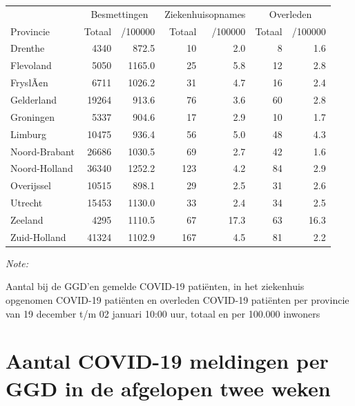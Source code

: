 \documentclass[
  english,
  man,floatsintext]{apa6}
\begin{document}
\begin{table}
\centering
\begin{threeparttable}
\begin{tabular}{lrrrrrr}
\toprule
\multicolumn{1}{c}{ } & \multicolumn{2}{c}{Besmettingen} & \multicolumn{2}{c}{Ziekenhuisopnames} & \multicolumn{2}{c}{Overleden} \\
\cmidrule(l{3pt}r{3pt}){2-3} \cmidrule(l{3pt}r{3pt}){4-5} \cmidrule(l{3pt}r{3pt}){6-7}
Provincie & Totaal & /100000 & Totaal & /100000 & Totaal & /100000\\
\midrule
Drenthe & 4340 & 872.5 & 10 & 2.0 & 8 & 1.6\\
Flevoland & 5050 & 1165.0 & 25 & 5.8 & 12 & 2.8\\
FryslÃ¢n & 6711 & 1026.2 & 31 & 4.7 & 16 & 2.4\\
Gelderland & 19264 & 913.6 & 76 & 3.6 & 60 & 2.8\\
Groningen & 5337 & 904.6 & 17 & 2.9 & 10 & 1.7\\
Limburg & 10475 & 936.4 & 56 & 5.0 & 48 & 4.3\\
Noord-Brabant & 26686 & 1030.5 & 69 & 2.7 & 42 & 1.6\\
Noord-Holland & 36340 & 1252.2 & 123 & 4.2 & 84 & 2.9\\
Overijssel & 10515 & 898.1 & 29 & 2.5 & 31 & 2.6\\
Utrecht & 15453 & 1130.0 & 33 & 2.4 & 34 & 2.5\\
Zeeland & 4295 & 1110.5 & 67 & 17.3 & 63 & 16.3\\
Zuid-Holland & 41324 & 1102.9 & 167 & 4.5 & 81 & 2.2\\
\bottomrule
\end{tabular}
\begin{tablenotes}
\item \textit{Note: } 
\item Aantal bij de GGD’en gemelde COVID-19 patiënten, in het ziekenhuis opgenomen COVID-19 patiënten en overleden COVID-19 patiënten per provincie van 19 december t/m 02 januari 10:00 uur, totaal en per 100.000 inwoners
\end{tablenotes}
\end{threeparttable}
\end{table}

\newpage

\hypertarget{aantal-covid-19-meldingen-per-ggd-in-de-afgelopen-twee-weken}{%
\section{Aantal COVID-19 meldingen per GGD in de afgelopen twee weken}\label{aantal-covid-19-meldingen-per-ggd-in-de-afgelopen-twee-weken}}
\end{document}
